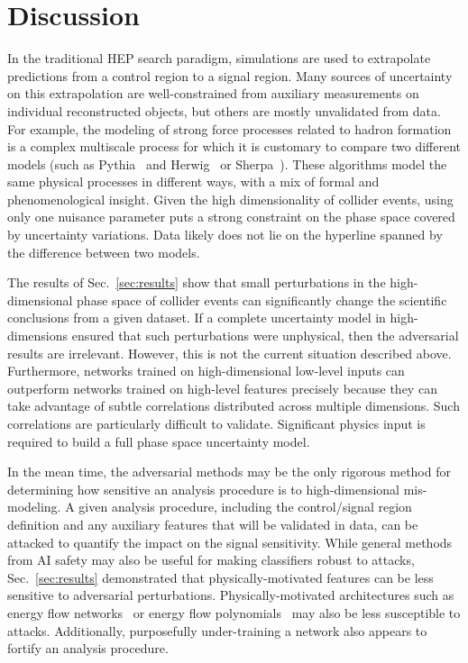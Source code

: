 \documentclass[reprint,nofootinbib,...]{revtex4-1}
\begin{document}
\section{Discussion}
\label{sec:discussion}

In the traditional HEP search paradigm, simulations are used to extrapolate predictions from a control region to a signal region.  Many sources of uncertainty on this extrapolation are well-constrained from auxiliary measurements on individual reconstructed objects, but others are mostly unvalidated from data.  For example, the modeling of strong force processes related to hadron formation is a complex multiscale process for which it is customary to compare two different models (such as Pythia~\cite{Sjostrand:2006za,Sjostrand:2007gs} and Herwig~\cite{Bahr:2008pv,Bellm:2015jjp} or Sherpa~\cite{Gleisberg:2008ta,Bothmann:2019yzt}).  These algorithms model the same physical processes in different ways, with a mix of formal and phenomenological insight.   Given the high dimensionality of collider events, using only one nuisance parameter puts a strong constraint on the phase space covered by uncertainty variations.  Data likely does not lie on the hyperline spanned by the difference between two models.

The results of Sec.~\ref{sec:results} show that small perturbations in the high-dimensional phase space of collider events can significantly change the scientific conclusions from a given dataset.  If a complete uncertainty model in high-dimensions ensured that such perturbations were unphysical, then the adversarial results are irrelevant.  However, this is not the current situation described above.  Furthermore, networks trained on high-dimensional low-level inputs can outperform networks trained on high-level features precisely because they can take advantage of subtle correlations distributed across multiple dimensions.  Such correlations are particularly difficult to validate.  Significant physics input is required to build a full phase space uncertainty model. 

In the mean time, the adversarial methods may be the only rigorous method for determining how sensitive an analysis procedure is to high-dimensional mis-modeling.  A given analysis procedure, including the control/signal region definition and any auxiliary features that will be validated in data, can be attacked to quantify the impact on the signal sensitivity.  While general methods from AI safety may also be useful for making classifiers robust to attacks, Sec.~\ref{sec:results} demonstrated that physically-motivated features can be less sensitive to adversarial perturbations.  Physically-motivated architectures such as energy flow networks~\cite{Komiske:2018cqr} or energy flow polynomials~\cite{Komiske:2017aww} may also be less susceptible to attacks.  Additionally, purposefully under-training a network also appears to fortify an analysis procedure.
\end{document}

